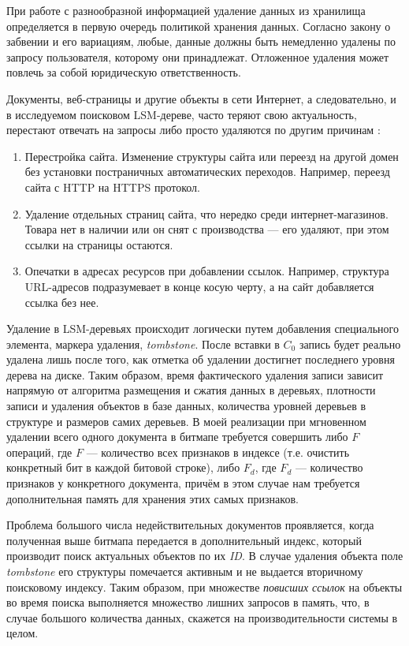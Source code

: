 При работе с разнообразной информацией удаление данных из хранилища определяется
в первую очередь политикой хранения данных. Согласно закону о забвении и его
вариациям, любые, данные должны быть немедленно удалены по запросу пользователя,
которому они принадлежат. Отложенное удаления может повлечь за собой юридическую
ответственность.

Документы, веб-страницы и другие объекты в сети Интернет, а следовательно, и в
исследуемом поисковом LSM-дереве, часто теряют свою актуальность, перестают
отвечать на запросы либо просто удаляются по другим причинам \cite{Dangling:2018}:
\begin{enumerate}
    \item Перестройка сайта. Изменение структуры сайта или переезд на другой
    домен без установки постраничных автоматических переходов. Например,
    переезд сайта с HTTP на HTTPS протокол.
    \item Удаление отдельных страниц сайта, что нередко среди интернет-магазинов.
    Товара нет в наличии или он снят с производства — его удаляют, при этом 
    ссылки на страницы остаются.
    \item Опечатки в адресах ресурсов при добавлении ссылок. Например, структура
    URL-адресов подразумевает в конце косую черту, а на сайт добавляется ссылка
    без нее.
\end{enumerate}

Удаление в LSM-деревьях происходит логически путем добавления специального элемента, маркера 
удаления, \textit{tombstone}. После вставки в $C_0$ запись будет реально удалена лишь после
того, как отметка об удалении достигнет последнего уровня дерева на диске. Таким
образом, время фактического удаления записи зависит напрямую от алгоритма размещения
и сжатия данных в деревьях, плотности записи и удаления объектов в базе данных,
количества уровней деревьев в структуре и размеров самих деревьев. В моей реализации
при мгновенном удалении всего одного документа в битмапе требуется совершить либо
$F$ операций, где $F$ — количество всех признаков в индексе (т.е. очистить конкретный бит
в каждой битовой строке), либо $F_d$, где $F_d$ — количество признаков у конкретного документа,
причём в этом случае нам требуется дополнительная память для хранения этих самых признаков.

Проблема большого числа недействительных документов проявляется, когда полученная
выше битмапа передается в дополнительный индекс, который производит поиск актуальных 
объектов по их \textit{ID}. В случае удаления объекта поле \textit{tombstone} его
структуры помечается активным и не выдается вторичному поисковому индексу.
Таким образом, при множестве \textit{повисших ссылок} на объекты во время поиска
выполняется множество лишних запросов в память, что, в случае большого
количества данных, скажется на производительности системы в целом.

